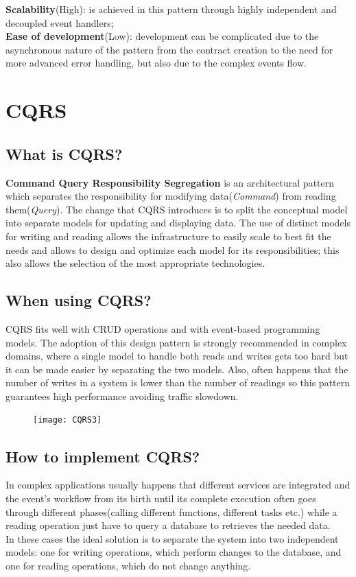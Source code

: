 \documentclass[11pt]{article} %
\begin{document}
 \textbf{Scalability}(\color{darkgreen}High\color{black}): is achieved in this pattern through highly independent and decoupled event handlers; \\
 
 \textbf{Ease of development}(\color{red}Low\color{black}): development can be complicated due to the asynchronous nature of the pattern from the contract creation to the need for more advanced error handling, but also due to the complex events flow.

\section{CQRS} 
\subsection{What is CQRS?}
\textbf{Command Query Responsibility Segregation} is an architectural pattern which separates the responsibility for modifying data(\emph{Command}) from reading them(\emph{Query}). The change that CQRS introduces is to split the conceptual model into separate models for updating and displaying data. The use of distinct models for writing and reading allows the infrastructure to easily scale to best fit the needs and allows to design and optimize each model for its responsibilities; this also allows the selection of the most appropriate technologies.

\subsection{When using CQRS?}
CQRS fits well with CRUD operations and with event-based programming models.
The adoption of this design pattern is strongly recommended in complex domains, where a single model to handle both reads and writes gets too hard but it can be made easier by separating the two models. Also, often happens that the number of writes in a system is lower than the number of readings so this pattern guarantees high performance avoiding traffic slowdown.\\

\begin{figure} [H]
	\centering
	\texttt{[image: CQRS3]}
\end{figure} 


\subsection{How to implement CQRS?}
In complex applications usually happens that different services are integrated and the event's workflow from its birth until its complete execution often goes through different phases(calling different functions, different tasks etc.) while a reading operation just have to query a database to retrieves the needed data. \\
In these cases the ideal solution is to separate the system into two independent models: one for writing operations, which perform changes to the database, and one for reading operations, which do not change anything.
  
\end{document}
